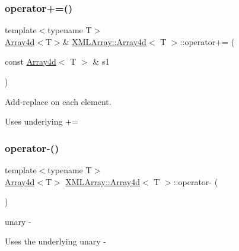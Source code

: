 \subsubsection{\texorpdfstring{operator+=()}{operator+=()}\hspace{0.1cm}{\footnotesize\ttfamily [3/3]}}
{\footnotesize\ttfamily template$<$typename T$>$ \\
\mbox{\hyperlink{classXMLArray_1_1Array4d}{Array4d}}$<$T$>$\& \mbox{\hyperlink{classXMLArray_1_1Array4d}{X\+M\+L\+Array\+::\+Array4d}}$<$ T $>$\+::operator+= (\begin{DoxyParamCaption}\item[{const \mbox{\hyperlink{classXMLArray_1_1Array4d}{Array4d}}$<$ T $>$ \&}]{s1 }\end{DoxyParamCaption})\hspace{0.3cm}{\ttfamily [inline]}}



Add-\/replace on each element. 

Uses underlying += \mbox{\label{classXMLArray_1_1Array4d_a33d29c88630265c416d8e8a7355f166e}} 
\subsubsection{\texorpdfstring{operator-\/()}{operator-()}\hspace{0.1cm}{\footnotesize\ttfamily [1/3]}}
{\footnotesize\ttfamily template$<$typename T$>$ \\
\mbox{\hyperlink{classXMLArray_1_1Array4d}{Array4d}}$<$T$>$ \mbox{\hyperlink{classXMLArray_1_1Array4d}{X\+M\+L\+Array\+::\+Array4d}}$<$ T $>$\+::operator-\/ (\begin{DoxyParamCaption}{ }\end{DoxyParamCaption})\hspace{0.3cm}{\ttfamily [inline]}}



unary -\/ 

Uses the underlying unary -\/ \mbox{\label{classXMLArray_1_1Array4d_a33d29c88630265c416d8e8a7355f166e}} 
